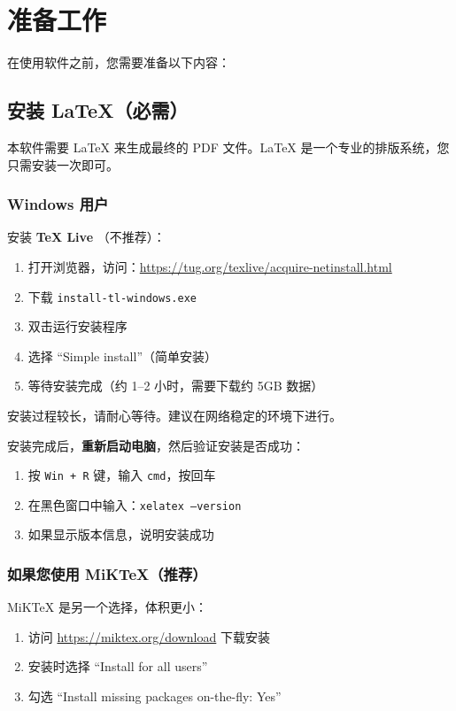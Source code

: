 \documentclass[UTF8,zihao=-4,openany]{ctexbook}
\begin{document}
\chapter{准备工作}

在使用软件之前，您需要准备以下内容：

\section{安装 LaTeX（必需）}

本软件需要 LaTeX 来生成最终的 PDF 文件。LaTeX 是一个专业的排版系统，您只需安装一次即可。

\subsection{Windows 用户}

安装 \textbf{TeX Live} （不推荐）：

\begin{enumerate}
	\item 打开浏览器，访问：\url{https://tug.org/texlive/acquire-netinstall.html}
	\item 下载 \texttt{install-tl-windows.exe}
	\item 双击运行安装程序
	\item 选择 ``Simple install''（简单安装）
	\item 等待安装完成（约 1--2 小时，需要下载约 5GB 数据）
\end{enumerate}

\begin{TipBox}
	安装过程较长，请耐心等待。建议在网络稳定的环境下进行。
\end{TipBox}

安装完成后，\textbf{重新启动电脑}，然后验证安装是否成功：
\begin{enumerate}
	\item 按 \texttt{Win + R} 键，输入 \texttt{cmd}，按回车
	\item 在黑色窗口中输入：\texttt{xelatex --version}
	\item 如果显示版本信息，说明安装成功
\end{enumerate}

\subsection{如果您使用 MiKTeX（推荐）}

MiKTeX 是另一个选择，体积更小：
\begin{enumerate}
	\item 访问 \url{https://miktex.org/download} 下载安装
	\item 安装时选择 ``Install for all users''
	\item 勾选 ``Install missing packages on-the-fly: Yes''
\end{enumerate}
\end{document}
